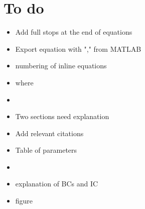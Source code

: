 \chapter{To do}

{\color{blue}
\begin{itemize}
    \item {\color{magenta}Add full stops at the end of equations}
    \item Export equation with "," from MATLAB
    \item {\color{magenta}numbering of inline equations}
    \item {\color{magenta}where}
    \item {\color{magenta}{unwanted vertical space}}
    \item Two sections need explanation
    \item Add relevant citations
    \item {\color{magenta}Table of parameters}
    \item {\color{magenta}{Write about SEI as well}}
    \item {\color{magenta}explanation of BCs and IC}
    \item {\color{magenta}figure}
\end{itemize}}